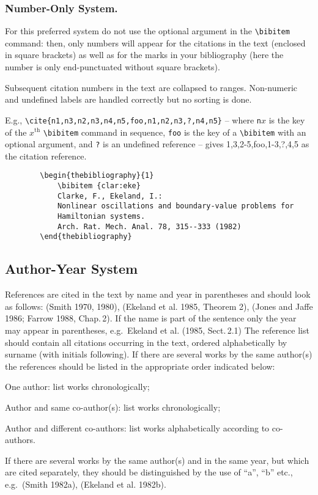 \documentclass{llncs}
\begin{document}
    \subsubsection*{Number-Only System.}
    For this preferred system do not use the optional argument
    in the \verb|\bibitem| command: then, only numbers will
    appear for the citations in the text (enclosed in square brackets)
    as well as for the marks in your
    bibliography (here the number is only end-punctuated without
    square brackets).

    Subsequent citation numbers in the text are collapsed to ranges.
    Non-numeric and undefined labels are handled correctly but no sorting is
    done.

    E.g., \verb|\cite{n1,n3,n2,n3,n4,n5,foo,n1,n2,n3,?,n4,n5}| -- where
    \verb|n|$x$ is the key of the $x^{\mathrm{th}}$ \verb|\bibitem|
    command in sequence, \verb|foo| is the key of a \verb|\bibitem| with an
    optional argument, and \verb|?| is an undefined reference -- gives
    1,3,2-5,foo,1-3,?,4,5 as the citation reference.

    \begin{verbatim}
        \begin{thebibliography}{1}
            \bibitem {clar:eke}
            Clarke, F., Ekeland, I.:
            Nonlinear oscillations and boundary-value problems for
            Hamiltonian systems.
            Arch. Rat. Mech. Anal. 78, 315--333 (1982)
        \end{thebibliography}
    \end{verbatim}
    \subsection{Author-Year System}
    References are cited in the text by name and year in parentheses
    and should look as follows:
    (Smith 1970, 1980), (Ekeland et al. 1985, Theorem 2), (Jones and Jaffe
    1986; Farrow 1988, Chap.\,2). If the name is part of the sentence
    only the year may appear in parentheses,
    e.g.\ Ekeland et al. (1985, Sect.\,2.1)
    The reference list should contain all citations occurring in the text,
    ordered alphabetically by surname (with initials following). If there
    are several works by the same author(s) the references should be listed
    in the appropriate order indicated below:
    \begin{alpherate}
        \setlength{\hfuzz}{5pt}
        \item
        One author: list works chronologically;
        \item
        Author and same co-author(s): list works chronologically;
        \item
        Author and different co-authors: list works alphabetically
        according to co-authors.
    \end{alpherate}
    If there are several works by the same author(s) and in the same year,
    but which are cited separately, they should be distinguished by the use
    of ``a'', ``b'' etc., e.g.\ (Smith 1982a), (Ekeland et al. 1982b).
\end{document}
